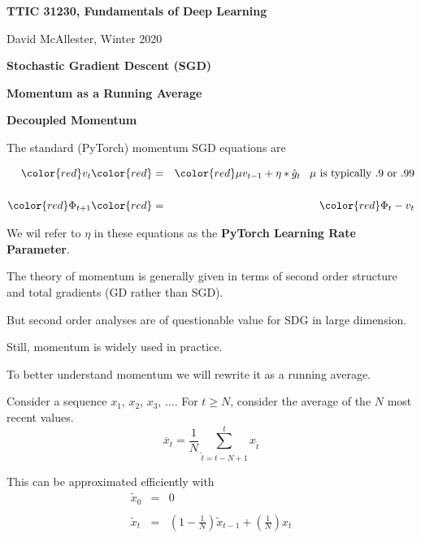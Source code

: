 


\newcommand{\solution}[1]{\bigskip {\bf Solution}: #1}



{\Huge
  \centerline{\bf TTIC 31230, Fundamentals of Deep Learning}
  \bigskip
  \centerline{David McAllester, Winter 2020}
  \vfill
  \centerline{\bf Stochastic Gradient Descent (SGD)}
  \vfill
  \centerline{\bf Momentum as a Running Average}
  \vfill
  \centerline{\bf Decoupled Momentum}
  \vfill
  \vfill


The standard (PyTorch) momentum SGD equations are

\begin{eqnarray*}
  {\color{red} v_t} & {\color{red} =} & {\color{red} \mu v_{t-1} + \eta * \hat{g}_t} \;\;\;\mbox{$\mu$ is typically .9 or .99}\\
  \\
  {\color{red} \Phi_{t+1}} & {\color{red} =} & {\color{red} \Phi_t -  v_t} \\
\end{eqnarray*}

We wil refer to $\eta$ in these equations as the {\bf PyTorch Learning Rate Parameter}.


The theory of momentum is generally given in terms of second order structure and total gradients (GD rather than SGD).

\vfill
But second order analyses are of questionable value for SDG in large dimension.

\vfill
Still, momentum is widely used in practice.

\vfill
To better understand momentum we will rewrite it as a running average.

Consider a sequence $x_1$, $x_2$, $x_3$, $\ldots$.
\vfill
For $t \geq N$, consider the average of the $N$ most recent values.
$$\overline{x}_t = \frac{1}{N} \sum_{\tilde{t} = t-N+1}^t x_{\tilde{t}}$$

\vfill
This can be approximated efficiently with
\begin{eqnarray*}
\tilde{x}_0 & = & 0 \\
\\
\tilde{x}_t & = & \left(1-\frac{1}{N}\right)\tilde{x}_{t-1} + \left(\frac{1}{N}\right)x_t
\end{eqnarray*}


}
